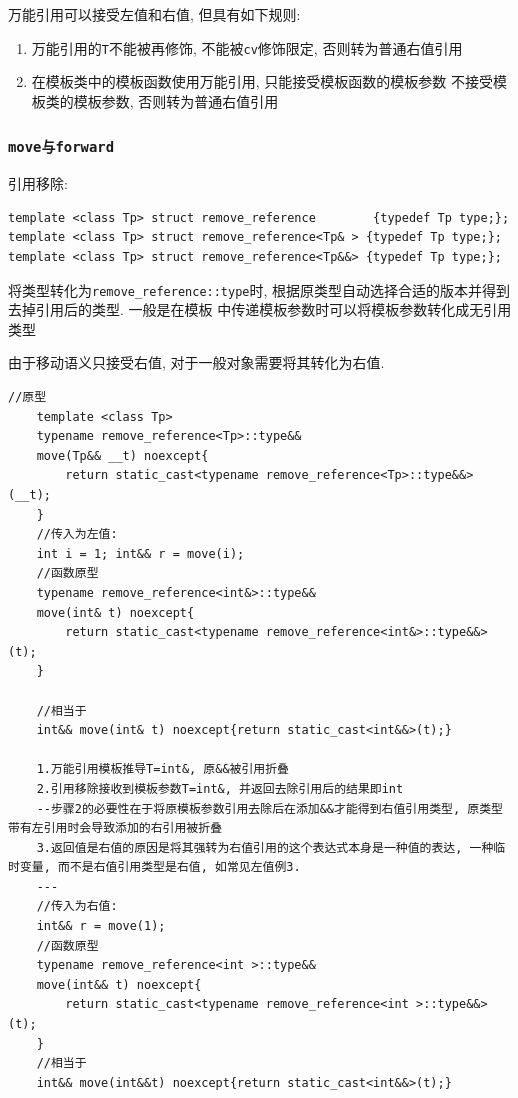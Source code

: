 万能引用可以接受左值和右值, 但具有如下规则:
\begin{enumerate}
	\item 万能引用的{\tt T}不能被再修饰, 不能被{\tt cv}修饰限定, 否则转为普通右值引用
	\item 在模板类中的模板函数使用万能引用, 只能接受模板函数的模板参数 
			不接受模板类的模板参数, 否则转为普通右值引用
\end{enumerate}
\subsubsection{\tt{move}与\tt{forward}}

引用移除:
\begin{lstlisting}
template <class Tp> struct remove_reference        {typedef Tp type;};
template <class Tp> struct remove_reference<Tp& > {typedef Tp type;};
template <class Tp> struct remove_reference<Tp&&> {typedef Tp type;};
\end{lstlisting}
将类型转化为{\tt remove\_reference::type}时, 根据原类型自动选择合适的版本并得到去掉引用后的类型. 一般是在模板
	中传递模板参数时可以将模板参数转化成无引用类型


由于移动语义只接受右值, 对于一般对象需要将其转化为右值.

\begin{lstlisting}[title=move]
	//原型
	template <class Tp>
	typename remove_reference<Tp>::type&&
	move(Tp&& __t) noexcept{
		return static_cast<typename remove_reference<Tp>::type&&>(__t);
	}
	//传入为左值:
	int i = 1; int&& r = move(i);
	//函数原型
	typename remove_reference<int&>::type&&
	move(int& t) noexcept{
		return static_cast<typename remove_reference<int&>::type&&>(t);
	}
	
	//相当于
	int&& move(int& t) noexcept{return static_cast<int&&>(t);}
	
	1.万能引用模板推导T=int&, 原&&被引用折叠
	2.引用移除接收到模板参数T=int&, 并返回去除引用后的结果即int
	--步骤2的必要性在于将原模板参数引用去除后在添加&&才能得到右值引用类型, 原类型带有左引用时会导致添加的右引用被折叠
	3.返回值是右值的原因是将其强转为右值引用的这个表达式本身是一种值的表达, 一种临时变量, 而不是右值引用类型是右值, 如常见左值例3.
	---
	//传入为右值:
	int&& r = move(1);
	//函数原型
	typename remove_reference<int >::type&&
	move(int&& t) noexcept{
		return static_cast<typename remove_reference<int >::type&&>(t);
	}
	//相当于
	int&& move(int&&t) noexcept{return static_cast<int&&>(t);}

\end{lstlisting}


